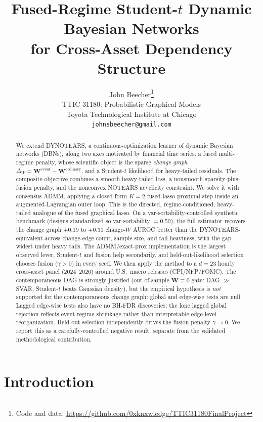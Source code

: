 \documentclass{article}
\title{Fused-Regime Student-$t$ Dynamic Bayesian Networks\\
for Cross-Asset Dependency Structure}
\author{%
  John Beecher\thanks{Code and data: \url{https://github.com/0xknxwledge/TTIC31180FinalProject}} \\
  TTIC 31180: Probabilistic Graphical Models \\
  Toyota Technological Institute at Chicago \\
  \texttt{johnsbeecher@gmail.com} \\
}
\newcommand{\W}{\bm{W}}
\newcommand{\Wd}{\Delta_{\!W}}
\begin{document}
\maketitle

\begin{abstract}
We extend DYNOTEARS, a continuous-optimization learner of dynamic Bayesian
networks (DBNs), along two axes motivated by financial time series: a fused
multi-regime penalty, whose scientific object is the sparse \emph{change graph}
$\Wd = \W^{\text{event}}-\W^{\text{ordinary}}$, and a Student-$t$ likelihood for
heavy-tailed residuals. The composite objective combines a smooth heavy-tailed
loss, a nonsmooth sparsity-plus-fusion penalty, and the nonconvex NOTEARS
acyclicity constraint. We solve it with consensus ADMM, applying a closed-form
$K{=}2$ fused-lasso proximal step inside an augmented-Lagrangian outer loop. This
is the directed, regime-conditioned, heavy-tailed analogue of the fused graphical
lasso. On a var-sortability-controlled synthetic benchmark (designs standardized so
var-sortability $=0.50$), the full estimator recovers the change graph $+0.19$ to
$+0.31$ change-$W$ AUROC better than the DYNOTEARS-equivalent across change-edge
count, sample size, and tail heaviness, with the gap widest under heavy tails. The
ADMM/exact-prox implementation is the largest observed lever, Student-$t$ and fusion
help secondarily, and held-out-likelihood selection chooses fusion ($\gamma>0$) in
every seed. We
then apply the method to a $d=23$ hourly cross-asset panel (2024--2026) around
U.S.\ macro releases (CPI/NFP/FOMC). The contemporaneous DAG is strongly justified
(out-of-sample $\W\equiv 0$ gate: DAG $\gg$ SVAR; Student-$t$ beats Gaussian
density), but the empirical hypothesis is \emph{not} supported for the contemporaneous
change graph: global and edge-wise tests are null. Lagged edge-wise tests also have
no BH-FDR discoveries; the lone lagged global rejection reflects event-regime
shrinkage rather than interpretable edge-level reorganization. Held-out selection
independently drives the fusion penalty $\gamma\to 0$. We report this as a
carefully-controlled negative result, separate from the validated methodological
contribution.
\end{abstract}

\section{Introduction}
\end{document}
